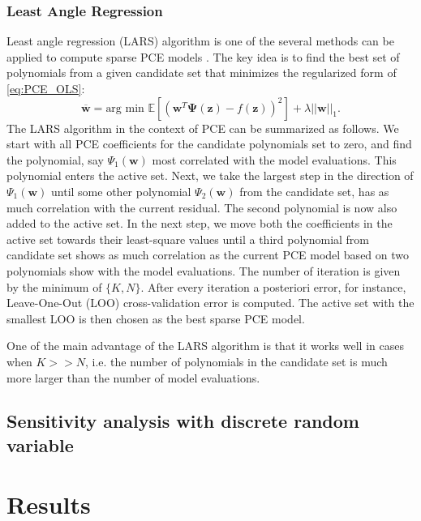 \documentclass[review]{elsarticle}
\numberwithin{equation}{section}
\numberwithin{equation}{section}
\begin{document}
\subsubsection{Least Angle Regression}
Least angle regression (LARS) algorithm \cite{efron2004} is one of the several methods can be applied to compute sparse PCE models \cite{BlatmanThesis, BLATMAN2011}. The key idea is to find the best set of polynomials from a given candidate set that minimizes the regularized form of \eqref{eq:PCE_OLS}:
\begin{equation}\label{regularized_LS}
\mathbf{\overline{w}} = \text{arg min }\mathbb{E}\left[\left(\mathbf{w}^T \boldsymbol{\Psi}(\mathbf{z}) - f(\mathbf{z})\right)^2\right] + \lambda ||\mathbf{w}||_1.
\end{equation}
The LARS algorithm in the context of PCE can be summarized as follows. We start with all PCE coefficients for the candidate polynomials set to zero, and find the polynomial, say $\Psi_1(\mathbf{w})$ most correlated with the model evaluations. This polynomial enters the active set. Next, we take the largest step in the direction of $\Psi_1(\mathbf{w})$ until some other polynomial $\Psi_2(\mathbf{w})$ from the candidate set, has as much correlation with the current residual. The second polynomial is now also added to the active set. In the next step, we move both the coefficients in the active set towards their least-square values until a third polynomial from candidate set shows as much correlation as the current PCE model based on two polynomials show with the model evaluations. The number of iteration is given by the minimum of $\{K,N\}$. After every iteration a posteriori error, for instance, Leave-One-Out (LOO) cross-validation error is computed. The active set with the smallest LOO is then chosen as the best sparse PCE
model.

One of the main advantage of the LARS algorithm is that it works well in cases when $K>>N$, i.e. the number of polynomials in the candidate set is much more larger than the number of model evaluations.


\subsection{Sensitivity analysis with discrete random variable}
\section{Results}\label{sec:results}
\end{document}
